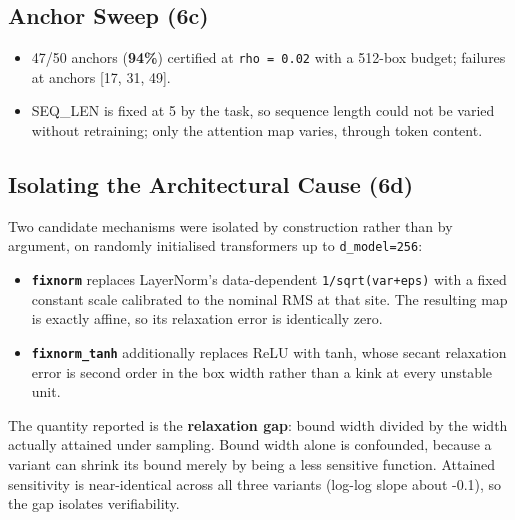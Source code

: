 \documentclass[10pt,journal]{IEEEtran}
\begin{document}
\subsection{Anchor Sweep (6c)}
\begin{itemize}
\item 47/50 anchors (\textbf{94\%}) certified at \texttt{rho = 0.02} with a 512-box budget; failures at anchors [17, 31, 49].
\item SEQ\_LEN is fixed at 5 by the task, so sequence length could not be varied without retraining; only the attention map varies, through token content.
\end{itemize}
\subsection{Isolating the Architectural Cause (6d)}
Two candidate mechanisms were isolated by construction rather than by argument, on randomly initialised transformers up to \texttt{d\_model=256}:
\begin{itemize}
\item \textbf{\texttt{fixnorm}} replaces LayerNorm's data-dependent \texttt{1/sqrt(var+eps)} with a fixed constant scale calibrated to the nominal RMS at that site. The resulting map is exactly affine, so its relaxation error is identically zero.
\item \textbf{\texttt{fixnorm\_tanh}} additionally replaces ReLU with tanh, whose secant relaxation error is second order in the box width rather than a kink at every unstable unit.
\end{itemize}
The quantity reported is the \textbf{relaxation gap}: bound width divided by the width actually attained under sampling. Bound width alone is confounded, because a variant can shrink its bound merely by being a less sensitive function. Attained sensitivity is near-identical across all three variants (log-log slope about -0.1), so the gap isolates verifiability.
\end{document}
